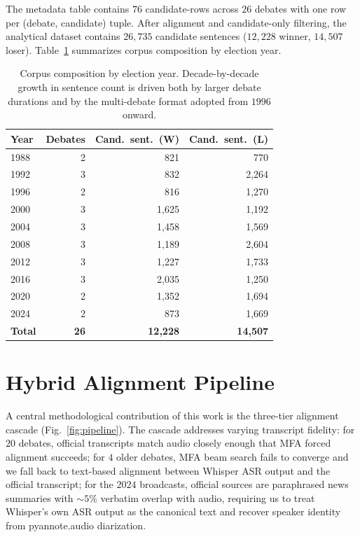 \documentclass[journal]{IEEEtran}
\begin{document}
The metadata table contains $76$ candidate-rows across $26$ debates
with one row per (debate, candidate) tuple. After alignment and
candidate-only filtering, the analytical dataset contains $26{,}735$
candidate sentences ($12{,}228$ winner, $14{,}507$ loser).
Table~\ref{tab:corpus} summarizes corpus composition by election year.

\begin{table}[t]
\caption{Corpus composition by election year. Decade-by-decade growth
in sentence count is driven both by larger debate durations and by the
multi-debate format adopted from $1996$ onward.}
\label{tab:corpus}
\centering
\begin{tabular}{lrrr}
\toprule
Year & Debates & Cand.\ sent.\ (W) & Cand.\ sent.\ (L) \\
\midrule
1988 & 2 & 821 & 770 \\
1992 & 3 & 832 & 2{,}264 \\
1996 & 2 & 816 & 1{,}270 \\
2000 & 3 & 1{,}625 & 1{,}192 \\
2004 & 3 & 1{,}458 & 1{,}569 \\
2008 & 3 & 1{,}189 & 2{,}604 \\
2012 & 3 & 1{,}227 & 1{,}733 \\
2016 & 3 & 2{,}035 & 1{,}250 \\
2020 & 2 & 1{,}352 & 1{,}694 \\
2024 & 2 & 873 & 1{,}669 \\
\midrule
\textbf{Total} & \textbf{26} & \textbf{12{,}228} & \textbf{14{,}507} \\
\bottomrule
\end{tabular}
\end{table}

\section{Hybrid Alignment Pipeline}
\label{sec:align}

A central methodological contribution of this work is the three-tier
alignment cascade (Fig.~\ref{fig:pipeline}). The cascade addresses
varying transcript fidelity: for $20$ debates, official transcripts
match audio closely enough that MFA forced alignment succeeds; for $4$
older debates, MFA beam search fails to converge and we fall back to
text-based alignment between Whisper ASR output and the official
transcript; for the $2024$ broadcasts, official sources are paraphrased
news summaries with $\sim 5\%$ verbatim overlap with audio, requiring
us to treat Whisper's own ASR output as the canonical text and recover
speaker identity from pyannote.audio diarization.
\end{document}
